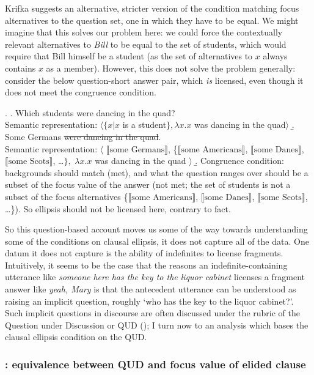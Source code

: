 \documentclass[doublespace]{umthesis}
\newcommand{\ext}[1]{\ensuremath{\llbracket \textrm{{#1}} \rrbracket}}
\begin{document}
Krifka suggests an alternative, stricter version of the condition matching focus alternatives to the question set, one in which they have to be equal. We might imagine that this solves our problem here: we could force the contextually relevant alternatives to {\it Bill} to be equal to the set of students, which would require that Bill himself be a student (as the set of alternatives to $x$ always contains $x$ as a member). However, this does not solve the problem generally: consider the below question-short answer pair, which \emph{is} licensed, even though it does not meet the congruence condition.

\ex. 	\a. Which students were dancing in the quad?\\
		Semantic representation: $\langle \{ x | x$ is a student$\}, \lambda x. x $ was dancing in the quad$\rangle$
	\b. Some Germans \sout{were dancing in the quad}.\\
		Semantic representation: $\langle$ \ext{some Germans}, \{\ext{some Americans}, \ext{some Danes}, \ext{some Scots}, \ldots $\},$ $\lambda x. x $ was dancing in the quad $\rangle$
	\b. Congruence condition: backgrounds should match (met), and what the question ranges over should be a subset of the focus value of the answer (not met; the set of students is not a subset of the focus alternatives \{\ext{some Americans}, \ext{some Danes}, \ext{some Scots}, \ldots \}). So ellipsis should not be licensed here, contrary to fact.
	
So this question-based account moves us some of the way towards understanding some of the conditions on clausal ellipsis, it does not capture all of the data. One datum it does not capture is the ability of indefinites to license fragments. Intuitively, it seems to be the case that the reasons an indefinite-containing utterance like {\it someone here has the key to the liquor cabinet} licenses a fragment answer like {\it yeah, Mary} is that the antecedent utterance can be understood as raising an implicit question, roughly `who has the key to the liquor cabinet?'. Such implicit questions in discourse are often discussed under the rubric of the Question under Discussion or QUD (\cite{RoQUD}); I turn now to an analysis which bases the clausal ellipsis condition on the QUD.

\subsubsection{\cite{Re07}: equivalence between QUD and focus value of elided clause}
\end{document}
